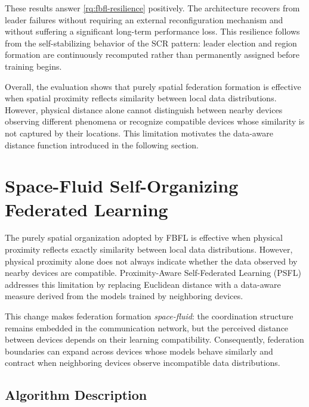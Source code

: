 These results answer \ref{rq:fbfl-resilience} positively.
%
The architecture recovers from leader failures without requiring an external
 reconfiguration mechanism and without suffering a significant long-term performance loss.
%
This resilience follows from the self-stabilizing behavior of the \gls{SCR} pattern: 
 leader election and region formation are continuously recomputed rather
 than permanently assigned before training begins.

Overall, 
 the evaluation shows that purely spatial federation formation is effective when spatial proximity reflects similarity 
 between local data distributions.
%
However, 
 physical distance alone cannot distinguish between nearby devices observing different phenomena 
 or recognize compatible devices whose similarity is not captured by their locations.
%
This limitation motivates the data-aware distance function introduced in the following section.

\section{Space-Fluid Self-Organizing Federated Learning}
\label{sec:psfl}

The purely spatial organization adopted by \gls{FBFL} is effective 
 when physical proximity reflects exactly similarity between local data distributions.
%
However, 
 physical proximity alone does not always indicate whether 
 the data observed by nearby devices are compatible.
%
Proximity-Aware Self-Federated Learning
 (\gls{PSFL})~\cite{DBLP:journals/iot/DominiFAVE26} 
 addresses this limitation by replacing Euclidean distance with a data-aware 
 measure derived from the models trained by neighboring devices.

This change makes federation formation \emph{space-fluid}: the coordination
structure remains embedded in the communication network, but the perceived
distance between devices depends on their learning compatibility.
%
Consequently, federation boundaries can expand across devices whose models
behave similarly and contract when neighboring devices observe incompatible
data distributions.


\subsection{Algorithm Description}
\label{sec:psfl-algorithm}

